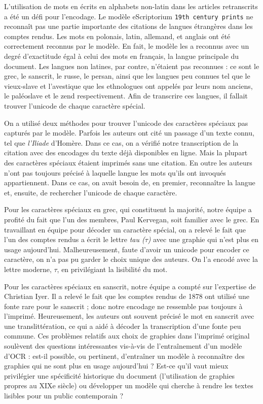 \documentclass{article}
\begin{document}
	L'utilisation de mots en écrits en alphabets non-latin dans les articles retranscrits a été un défi pour l’encodage. Le modèle eScriptorium \texttt{19th century prints} ne reconnaît pas une partie importante des citations de langues étrangères dans les comptes rendus. Les mots en polonais, latin, allemand, et anglais ont été correctement reconnus par le modèle. En fait, le modèle les a reconnus avec un degré d’exactitude égal à celui des mots en français, la langue principale du document. Les langues non latines, par contre, n’étaient pas reconnues : ce sont le grec, le sanscrit, le russe, le persan, ainsi que les langues peu connues tel que le vieux-slave et l’avestique que les ethnologues ont appelés par leurs nom anciens, le paléoslave et le zend respectivement. Afin de transcrire ces langues, il fallait trouver l’unicode de chaque caractère spécial.
	
	On a utilisé deux méthodes pour trouver l’unicode des caractères spéciaux pas capturés par le modèle. Parfois les auteurs ont cité un passage d’un texte connu, tel que \textit{l’Iliade} d'Homère. Dans ce cas, on a vérifié notre transcription de la citation avec des encodages du texte déjà disponibles en ligne. Mais la plupart des caractères spéciaux étaient imprimés sans une citation. En outre les auteurs n’ont pas toujours précisé à laquelle langue les mots qu’ils ont invoqués appartiennent. Dans ce cas, on avait besoin de, en premier, reconnaître la langue et, ensuite, de rechercher l’unicode de chaque caractère.
	
	Pour les caractères spéciaux en grec, qui constituent la majorité, notre équipe a profité du fait que l'un des membres, Paul Kervegan, soit familier avec le grec. En travaillant en équipe pour décoder un caractère spécial, on a relevé le fait que l’un des comptes rendus a écrit le lettre \textit{tau ($\tau$)} avec une graphie qui n'est plus en usage aujourd'hui. Malheureusement, faute d'avoir un unicode pour encoder ce caractère, on n’a pas pu garder le choix unique des auteurs. On l’a encodé avec la lettre moderne, \textit{$\tau$}, en privilégiant la lisibilité du mot.
	
	Pour les caractères spéciaux en sanscrit, notre équipe a compté sur l’expertise de Christian Iyer. Il a relevé le fait que les comptes rendus de 1878 ont utilisé une fonte rare pour le sanscrit ; donc notre encodage ne ressemble pas toujours à l’imprimé. Heureusement, les auteurs ont souvent précisé le mot en sanscrit avec une translittération, ce qui a aidé à décoder la transcription d’une fonte peu commune. Ces problèmes relatifs aux choix de graphies dans l'imprimé original soulèvent des questions intéressantes vis-à-vis de l'entraînement d'un modèle d'OCR : est-il possible, ou pertinent, d'entraîner un modèle à reconnaître des graphies qui ne sont plus en usage aujourd'hui ? Est-ce qu'il vaut mieux privilégier une spécificité historique du document (l'utilisation de graphies propres au XIXe siècle) ou développer un modèle qui cherche à rendre les textes lisibles pour un public contemporain ?
	
\end{document}
